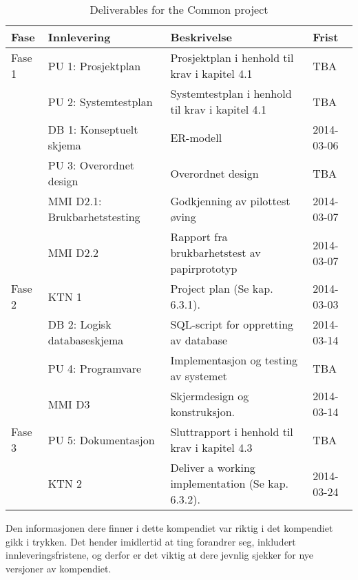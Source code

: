 \begin{table}[h]
\begin{tabularx}{\textwidth}{ l X X l }

\hline
\hline
Fase & Innlevering & Beskrivelse & Frist \\
\hline

Fase 1
&
PU 1: Prosjektplan &
Prosjektplan i henhold til krav i kapitel 4.1 &
TBA \\

&
PU 2: Systemtestplan &
Systemtestplan i henhold til krav i kapitel 4.1 &
TBA \\

&
DB 1: Konseptuelt skjema &
ER-modell &
2014-03-06 \\

&
PU 3: Overordnet design &
Overordnet design &
TBA \\

&
MMI D2.1: Brukbarhetstesting &
Godkjenning av pilottest øving &
2014-03-07 \\

&
MMI D2.2 &
Rapport fra brukbarhetstest av papirprototyp &
2014-03-07 \\

Fase 2
&
KTN 1 &
Project plan (Se kap. 6.3.1). &
2014-03-03 \\

&
DB 2: Logisk databaseskjema &
SQL-script for oppretting av database &
2014-03-14 \\

&
PU 4: Programvare &
Implementasjon og testing av systemet &
TBA \\

&
MMI D3 &
Skjermdesign og konstruksjon. &
2014-03-14 \\

Fase 3
&
PU 5: Dokumentasjon &
Sluttrapport i henhold til krav i kapitel 4.3 &
TBA \\

&
KTN 2 &
Deliver a working implementation (Se kap. 6.3.2). &
2014-03-24 \\

\hline

\end{tabularx}
\caption{Deliverables for the Common project}
\end{table}

Den informasjonen dere finner i dette kompendiet var riktig i det kompendiet gikk i trykken. Det hender imidlertid at ting forandrer seg, inkludert innleveringsfristene, og derfor er det viktig at dere jevnlig sjekker for nye versjoner av kompendiet.

